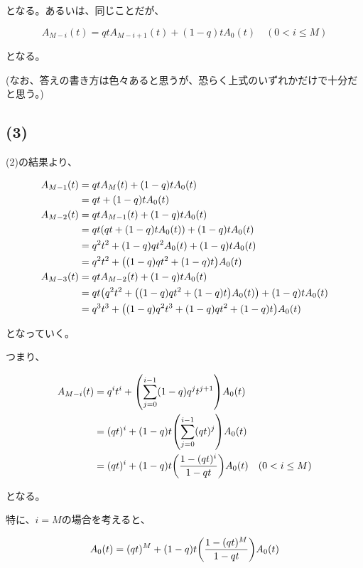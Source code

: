 \documentclass[a4paper, 10pt, dvipdfmx]{jlreq}
\begin{document}
となる。あるいは、同じことだが、

\begin{equation*}
  A_{M-i}(t)=qtA_{M-i+1}(t)+(1-q)tA_0(t) \quad (0 < i \leq M)
\end{equation*}

となる。

(なお、答えの書き方は色々あると思うが、恐らく上式のいずれかだけで十分だと思う。)

\subsection*{(3)}

(2)の結果より、

\begin{align*}
  A_{M-1}(t) & =qtA_{M}(t)+(1-q)tA_0(t)                                  \\
             & =qt+(1-q)tA_0(t)                                          \\
  A_{M-2}(t) & =qtA_{M-1}(t)+(1-q)tA_0(t)                                \\
             & =qt\qty(qt+(1-q)tA_0(t))+(1-q)tA_0(t)                     \\
             & =q^2t^2+(1-q)qt^2A_0(t)+(1-q)tA_0(t)                      \\
             & =q^2t^2+\qty((1-q)qt^2+(1-q)t)A_0(t)                      \\
  A_{M-3}(t) & =qtA_{M-2}(t)+(1-q)tA_0(t)                                \\
             & =qt\qty(q^2t^2+\qty((1-q)qt^2+(1-q)t)A_0(t))+(1-q)tA_0(t) \\
             & =q^3t^3+\qty((1-q)q^2t^3+(1-q)qt^2+(1-q)t)A_0(t)
\end{align*}


となっていく。

つまり、

\begin{align*}
  A_{M-i}(t) & =q^i t^i+\qty(\sum_{j=0}^{i-1}(1-q)q^{j}t^{j+1})A_0(t)               \\
             & =(qt)^i+(1-q)t\qty(\sum_{j=0}^{i-1}(qt)^{j})A_0(t)                   \\
             & =(qt)^i+(1-q)t\qty(\frac{1-(qt)^i}{1-qt})A_0(t) \quad (0 < i \leq M)
\end{align*}

となる。

特に、$i=M$の場合を考えると、

\begin{equation*}
  A_0(t)  = (qt)^M+(1-q)t\qty(\frac{1-(qt)^M}{1-qt})A_0(t)
\end{equation*}
\end{document}
